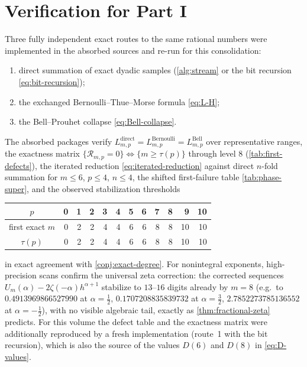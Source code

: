 \documentclass[11pt,oneside]{article}
\numberwithin{equation}{section}
\theoremstyle{definition}
\theoremstyle{remark}
\newcommand{\defect}{\mathcal R}
\begin{document}
\section{Verification for Part I}
\label{sec:verification-sums}

Three fully independent exact routes to the same rational numbers were
implemented in the absorbed sources and re-run for this
consolidation:
\begin{enumerate}
\item direct summation of exact dyadic samples
(\cref{alg:stream} or the bit recursion \eqref{eq:bit-recursion});
\item the exchanged Bernoulli--Thue--Morse formula \eqref{eq:L-H};
\item the Bell--Prouhet collapse \eqref{eq:Bell-collapse}.
\end{enumerate}
The absorbed packages verify
$L^{\mathrm{direct}}_{m,p}=L^{\mathrm{Bernoulli}}_{m,p}
=L^{\mathrm{Bell}}_{m,p}$ over representative ranges, the exactness
matrix $\{\defect_{m,p}=0\}\Leftrightarrow\{m\ge\tau(p)\}$ through
level $8$ (\cref{tab:first-defects}), the iterated reduction
\eqref{eq:iterated-reduction} against direct $n$-fold summation for
$m\le6$, $p\le4$, $n\le4$, the shifted first-failure table
\ref{tab:phase-super}, and the observed stabilization thresholds
\begin{center}
\small
\begin{tabular}{c|rrrrrrrrrrr}
\toprule
$p$ & 0&1&2&3&4&5&6&7&8&9&10\\
\midrule
first exact $m$ & 0&2&2&4&4&6&6&8&8&10&10\\
$\tau(p)$       & 0&2&2&4&4&6&6&8&8&10&10\\
\bottomrule
\end{tabular}
\end{center}
in exact agreement with \cref{conj:exact-degree}.  For nonintegral
exponents, high-precision scans confirm the universal zeta correction:
the corrected sequences $U_m(\alpha)-2\zeta(-\alpha)h^{\alpha+1}$
stabilize to $13$--$16$ digits already by $m=8$ (e.g.\ to
$0.4913969866527990$ at $\alpha=\tfrac12$, $0.1707208835839732$ at
$\alpha=\tfrac32$, $2.7852273785136552$ at $\alpha=-\tfrac12$), with
no visible algebraic tail, exactly as \cref{thm:fractional-zeta}
predicts.  For this volume the defect table and the exactness matrix
were additionally reproduced by a fresh implementation (route~1 with
the bit recursion), which is also the source of the values $D(6)$ and
$D(8)$ in \eqref{eq:D-values}.
\end{document}
